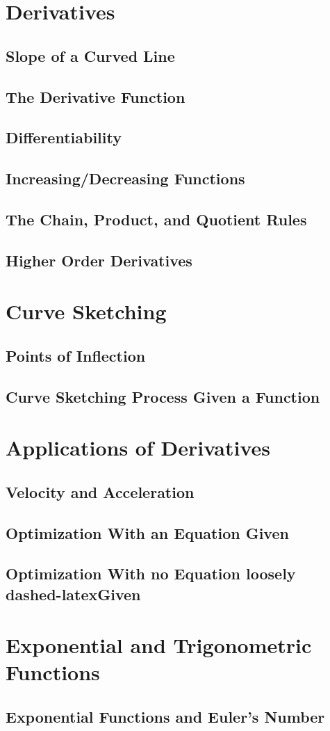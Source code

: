 \documentclass[14pt]{article}
\begin{document}
    \section{Derivatives}
        \subsection{Slope of a Curved Line}
        \subsection{The Derivative Function}
        \subsection{Differentiability}
        \subsection{Increasing/Decreasing Functions}
        \subsection{The Chain, Product, and Quotient Rules}
        \subsection{Higher Order Derivatives}

    \section{Curve Sketching}
        \subsection{Points of Inflection}
        \subsection{Curve Sketching Process Given a Function}
    
    \section{Applications of Derivatives}
        \subsection{Velocity and Acceleration}
        \subsection{Optimization With an Equation Given}
        \subsection{Optimization With no Equation loosely dashed-latexGiven}

    \section{Exponential and Trigonometric Functions}
    \subsection{Exponential Functions and Euler's Number}
\end{document}

